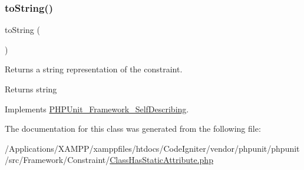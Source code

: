\subsubsection{\texorpdfstring{to\+String()}{toString()}}
{\footnotesize\ttfamily to\+String (\begin{DoxyParamCaption}{ }\end{DoxyParamCaption})}

Returns a string representation of the constraint.

\begin{DoxyReturn}{Returns}
string 
\end{DoxyReturn}


Implements \mbox{\hyperlink{interface_p_h_p_unit___framework___self_describing_a5558c5d549f41597377fa1ea8a1cefa3}{P\+H\+P\+Unit\+\_\+\+Framework\+\_\+\+Self\+Describing}}.



The documentation for this class was generated from the following file\+:\begin{DoxyCompactItemize}
\item 
/\+Applications/\+X\+A\+M\+P\+P/xamppfiles/htdocs/\+Code\+Igniter/vendor/phpunit/phpunit/src/\+Framework/\+Constraint/\mbox{\hyperlink{_class_has_static_attribute_8php}{Class\+Has\+Static\+Attribute.\+php}}\end{DoxyCompactItemize}
